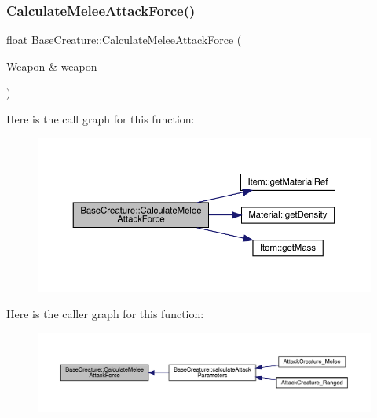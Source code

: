 \subsubsection{\texorpdfstring{Calculate\+Melee\+Attack\+Force()}{CalculateMeleeAttackForce()}}
{\footnotesize\ttfamily float Base\+Creature\+::\+Calculate\+Melee\+Attack\+Force (\begin{DoxyParamCaption}\item[{\mbox{\hyperlink{class_weapon}{Weapon}} \&}]{weapon }\end{DoxyParamCaption})}

Here is the call graph for this function\+:
\nopagebreak
\begin{figure}[H]
\begin{center}
\leavevmode
\includegraphics[width=350pt]{d2/d3b/class_base_creature_ac81e681e444ed860c212463025d04a1d_cgraph}
\end{center}
\end{figure}
Here is the caller graph for this function\+:
\nopagebreak
\begin{figure}[H]
\begin{center}
\leavevmode
\includegraphics[width=350pt]{d2/d3b/class_base_creature_ac81e681e444ed860c212463025d04a1d_icgraph}
\end{center}
\end{figure}
\mbox{\label{class_base_creature_ac5c9f52046801eb47701ef8b0f1eb32c}} 
